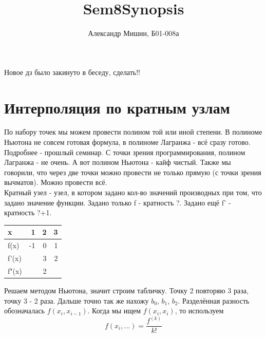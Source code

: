 \documentclass[a4paper,12pt]{article}
\title{Sem8Synopsis}
\author{Александр Мишин, Б01-008а}
\date{}
\newcommand\attention[1]{\colorbox{cyan!30}{#1}}
\begin{document}
\maketitle

\attention{Новое дз было закинуто в беседу, сделать!!}
\section{Интерполяция по кратным узлам}
По набору точек мы можем провести полином той или иной степени. В полиноме Ньютона не совсем готовая формула, в полиноме Лагранжа - всё сразу готово. Подробнее - прошлый семинар. С точки зрения программирования, полином Лагранжа - не очень. А вот полином Ньютона - кайф чистый. Также мы говорили, что через две точки можно провести не только прямую (с точки зрения вычматов). Можно провести всё.\\

Кратный узел - узел, в котором задано кол-во значений производных при том, что задано значение функции. Задано только f - кратность ?. Задано ещё f' - кратность ?+1.\\


\begin{table}[h!]
\centering
\begin{tabular}{|l|l|r|r|}
\hline
x     & \multicolumn{1}{r|}{1}  & 2 & 3                     \\ \hline
f(x)  & \multicolumn{1}{r|}{-1} & 0 & 1                     \\ \hline
f'(x) &                         & 3 & 2                     \\ \hline
f"(x) &                         & 2 & \multicolumn{1}{l|}{} \\ \hline
\end{tabular}
\end{table}

Решаем методом Ньютона, значит строим табличку. Точку 2 повторяю 3 раза, точку 3 - 2 раза. Дальше точно так же нахожу $b_0$, $b_1$, $b_2$. Разделённая разность обозначалась $f(x_i, x_{i-1})$. Когда мы ищем $f(x_i, x_i)$, то используем 
\[f(x_i, ...) = \frac{f^{(k)}}{k!}\]
\end{document}
